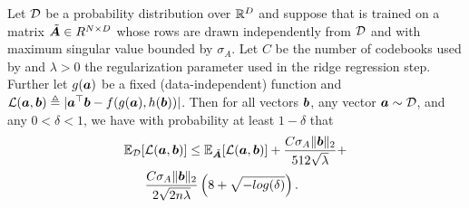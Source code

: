 \begin{lemma} \label{lemma:regGeneralize}

Let $\mathcal{D}$ be a probability distribution over $\mathbb{R}^D$ and suppose that \oursp is trained on a matrix $\tilde{\bm{A}} \in R^{N \times D}$ whose rows are drawn independently from $\mathcal{D}$ and with maximum singular value bounded by $\sigma_A$. Let $C$ be the number of codebooks used by \oursp and $\lambda > 0$ the regularization parameter used in the ridge regression step. Further let $g(\bm{a})$ be a fixed (data-independent) function and $\mathcal{L}(\bm{a}, \bm{b}) \triangleq |\bm{a}^\top \bm{b} - f(g(\bm{a}), h(\bm{b}))|$. Then for all vectors $\bm{b}$, any vector $\bm{a} \sim \mathcal{D}$, and any $0 < \delta < 1$, we have with probability at least $1 - \delta$ that
\begin{align} \label{eq:regressGeneralize}
    \begin{split}
    \mathbb{E}_{\mathcal{D}}[ & \mathcal{L}(\bm{a}, \bm{b})] \le \mathbb{E}_{\tilde{\bm{A}}}[\mathcal{L}(\bm{a}, \bm{b})] + \frac{C \sigma_A \lVert\bm{b}\rVert_2}{512 \sqrt{\lambda}} + \\
    &\frac{C \sigma_A \lVert\bm{b}\rVert_2}{2\sqrt{2n \lambda}} \left( 8 + \sqrt{-log(\delta)} \right).
    \end{split}
\end{align}
\end{lemma}

